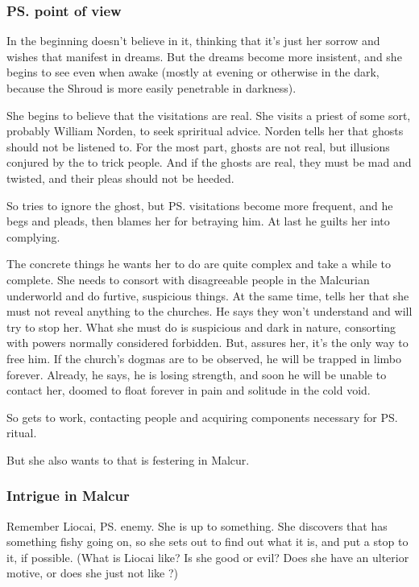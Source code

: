\begin{garbage}
\subsubsection{\ps{\Tiroco} point of view}
In the beginning \Tiroco{} doesn't believe in it, thinking that it's just her sorrow and wishes that manifest in dreams. But the dreams become more insistent, and she begins to see \Icor{} even when awake (mostly at evening or otherwise in the dark, because the Shroud is more easily penetrable in darkness). 

She begins to believe that the visitations are real. She visits a priest of some sort, probably William Norden, to seek spriritual advice. Norden tells her that ghosts should not be listened to. For the most part, ghosts are not real, but illusions conjured by the \Qliphoth{} to trick people. And if the ghosts are real, they must be mad and twisted, and their pleas should not be heeded.

So \Tiroco{} tries to ignore the ghost, but \ps{\Icor} visitations become more frequent, and he begs and pleads, then blames her for betraying him. At last he guilts her into complying. 

The concrete things he wants her to do are quite complex and take a while to complete. She needs to consort with disagreeable people in the Malcurian underworld and do furtive, suspicious things. At the same time, \Icor{} tells her that she must not reveal anything to the churches. He says they won't understand and will try to stop her. What she must do is suspicious and dark in nature, consorting with powers normally considered forbidden. But, \Icor{} assures her, it's the only way to free him. If the church's dogmas are to be observed, he will be trapped in limbo forever. Already, he says, he is losing strength, and soon he will be unable to contact her, doomed to float forever in pain and solitude in the cold void. 

So \Tiroco{} gets to work, contacting people and acquiring components necessary for \ps{\Icor}  ritual. 

But she also wants to  that is festering in Malcur. 





\subsubsection{Intrigue in Malcur}
Remember Liocai, \ps{\Tiroco} enemy. She is up to something. She discovers that \Tiroco{} has something fishy going on, so she sets out to find out what it is, and put a stop to it, if possible. 
(What is Liocai like? 
 Is she good or evil? 
 Does she have an ulterior motive, or does she just not like \Tiroco?)


\end{garbage}
